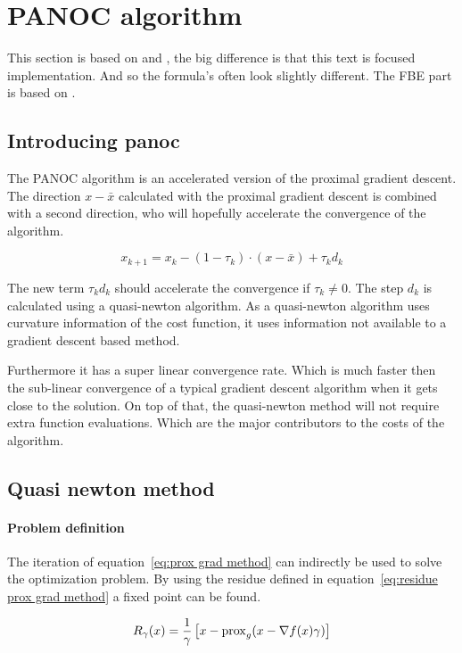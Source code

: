 \chapter{PANOC algorithm}
	This section is based on \cite{LorenzoStella2017} and \cite{AjaySathya2017}, the big difference is that this text is focused implementation. And so the formula's often look slightly different. The FBE part is based on \cite{Themelis}.
	\section{Introducing panoc}
		The PANOC algorithm is an accelerated version of the proximal gradient descent. The direction  $x-\bar{x}$ calculated with the proximal gradient descent  is combined with a second direction, who will hopefully accelerate the convergence of the algorithm.
		
		\begin{equation}
		x_{k+1} = x_k - (1-\tau_k)\cdot (x-\bar{x}) + \tau_k d_k
		\end{equation}
		
		The new term $\tau_kd_k$ should accelerate the convergence if $\tau_k\neq0$. The step $d_k$ is calculated using a quasi-newton algorithm. As a quasi-newton algorithm uses curvature information of the cost function, it uses information not available to a gradient descent based method. 
		
		Furthermore it has a super linear convergence rate. Which is much faster then the sub-linear convergence of a typical gradient descent algorithm when it gets close to the solution. On top of that, the quasi-newton method will not require extra function evaluations. Which are the major contributors to the costs of the algorithm.
		
	\section{Quasi newton method}
		\subsubsection{Problem definition}
			The iteration of equation~\ref{eq:prox grad method} can indirectly be used to solve the optimization problem.  By using the residue defined in equation~\ref{eq:residue prox grad method} a fixed point can be found. 
			
			\begin{equation}
			R_{\gamma}(x)= \frac{1}{\gamma}\left[ x - \operatorname{prox}_g( x - \nabla f(x)\gamma) \right]
			\label{eq:residue prox grad method}
			\end{equation}
			

